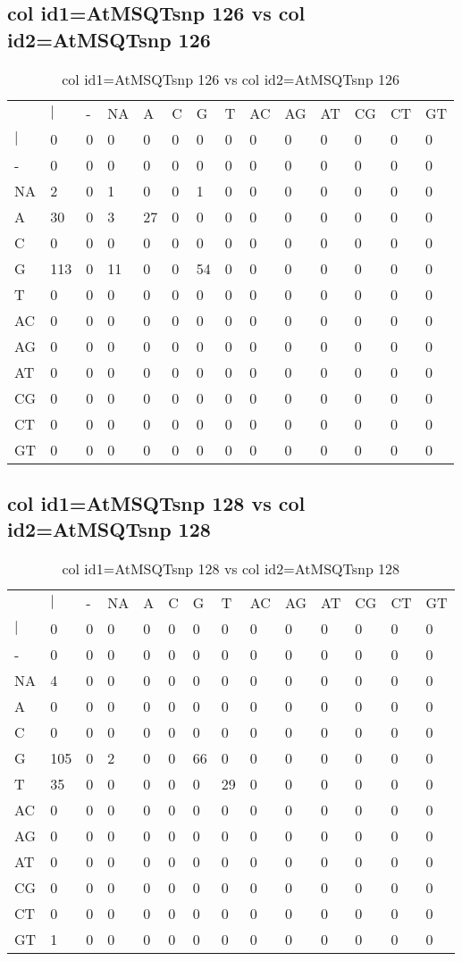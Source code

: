\subsection{col id1=AtMSQTsnp 126 vs col id2=AtMSQTsnp 126}
\begin{center}
\begin{longtable}{|l|l|l|l|l|l|l|l|l|l|l|l|l|l|}
\caption{col id1=AtMSQTsnp 126 vs col id2=AtMSQTsnp 126} \label{table_dm506}\\
\hline
\\
\hline
&$|$&-&NA&A&C&G&T&AC&AG&AT&CG&CT&GT\\
$|$&0&0&0&0&0&0&0&0&0&0&0&0&0\\
-&0&0&0&0&0&0&0&0&0&0&0&0&0\\
NA&2&0&1&0&0&1&0&0&0&0&0&0&0\\
A&30&0&3&27&0&0&0&0&0&0&0&0&0\\
C&0&0&0&0&0&0&0&0&0&0&0&0&0\\
G&113&0&11&0&0&54&0&0&0&0&0&0&0\\
T&0&0&0&0&0&0&0&0&0&0&0&0&0\\
AC&0&0&0&0&0&0&0&0&0&0&0&0&0\\
AG&0&0&0&0&0&0&0&0&0&0&0&0&0\\
AT&0&0&0&0&0&0&0&0&0&0&0&0&0\\
CG&0&0&0&0&0&0&0&0&0&0&0&0&0\\
CT&0&0&0&0&0&0&0&0&0&0&0&0&0\\
GT&0&0&0&0&0&0&0&0&0&0&0&0&0\\
\hline
\end{longtable}
\end{center}

\subsection{col id1=AtMSQTsnp 128 vs col id2=AtMSQTsnp 128}
\begin{center}
\begin{longtable}{|l|l|l|l|l|l|l|l|l|l|l|l|l|l|}
\caption{col id1=AtMSQTsnp 128 vs col id2=AtMSQTsnp 128} \label{table_dm508}\\
\hline
\\
\hline
&$|$&-&NA&A&C&G&T&AC&AG&AT&CG&CT&GT\\
$|$&0&0&0&0&0&0&0&0&0&0&0&0&0\\
-&0&0&0&0&0&0&0&0&0&0&0&0&0\\
NA&4&0&0&0&0&0&0&0&0&0&0&0&0\\
A&0&0&0&0&0&0&0&0&0&0&0&0&0\\
C&0&0&0&0&0&0&0&0&0&0&0&0&0\\
G&105&0&2&0&0&66&0&0&0&0&0&0&0\\
T&35&0&0&0&0&0&29&0&0&0&0&0&0\\
AC&0&0&0&0&0&0&0&0&0&0&0&0&0\\
AG&0&0&0&0&0&0&0&0&0&0&0&0&0\\
AT&0&0&0&0&0&0&0&0&0&0&0&0&0\\
CG&0&0&0&0&0&0&0&0&0&0&0&0&0\\
CT&0&0&0&0&0&0&0&0&0&0&0&0&0\\
GT&1&0&0&0&0&0&0&0&0&0&0&0&0\\
\hline
\end{longtable}
\end{center}

